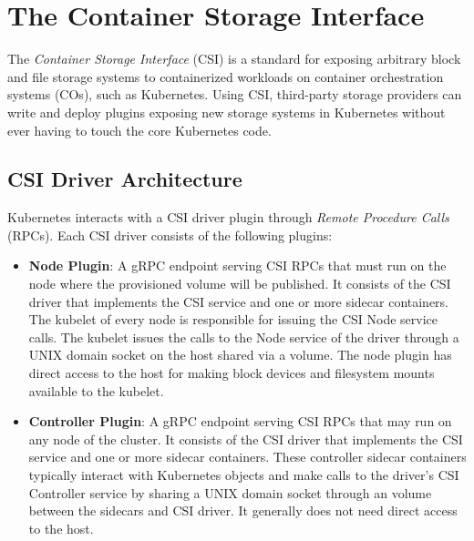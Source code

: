 \section{The Container Storage Interface}
\label{section:background-csi}

The \textit{Container Storage Interface} (CSI) is a standard for exposing
arbitrary block and file storage systems to containerized workloads on container
orchestration systems (COs), such as Kubernetes. Using CSI, third-party storage
providers can write and deploy plugins exposing new storage systems in
Kubernetes without ever having to touch the core Kubernetes code.

\subsection{CSI Driver Architecture}
\label{section:backgroud-csi-plugins-architecture}

Kubernetes interacts with a CSI driver plugin through \textit{Remote Procedure
      Calls} (RPCs). Each CSI driver consists of the following plugins:

\begin{itemize}
      \item
            \textbf{Node Plugin}: A gRPC endpoint serving CSI RPCs that must run
            on the node where the provisioned volume will be published. It
            consists of the CSI driver that implements the CSI  service
            and one or more sidecar containers. The kubelet of every node is
            responsible for issuing the CSI Node service calls. The kubelet
            issues the calls to the Node service of the driver through a UNIX
            domain socket on the host shared via a  volume. The
            node plugin has direct access to the host for making block devices
            and filesystem mounts available to the kubelet.
      \item
            \textbf{Controller Plugin}: A gRPC endpoint serving CSI RPCs that
            may run on any node of the cluster. It consists of the CSI driver
            that implements the CSI  service and one or more
            sidecar containers. These controller sidecar containers typically
            interact with Kubernetes objects and make calls to the driver's CSI
            Controller service by sharing a UNIX domain socket through an
             volume between the sidecars and CSI driver. It
            generally does not need direct access to the host.
\end{itemize}

